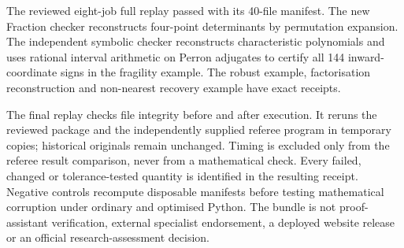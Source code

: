 \documentclass[
  11pt,
  a4paper,
]{article}
\begin{document}
The reviewed eight-job full replay passed with its 40-file manifest. The
new Fraction checker reconstructs four-point determinants by permutation
expansion. The independent symbolic checker reconstructs characteristic
polynomials and uses rational interval arithmetic on Perron adjugates to
certify all 144 inward-coordinate signs in the fragility example. The
robust example, factorisation reconstruction and non-nearest recovery
example have exact receipts.

The final replay checks file integrity before and after execution. It
reruns the reviewed package and the independently supplied referee
program in temporary copies; historical originals remain unchanged.
Timing is excluded only from the referee result comparison, never from a
mathematical check. Every failed, changed or tolerance-tested quantity
is identified in the resulting receipt. Negative controls recompute
disposable manifests before testing mathematical corruption under
ordinary and optimised Python. The bundle is not proof-assistant
verification, external specialist endorsement, a deployed website
release or an official research-assessment decision.
\end{document}
